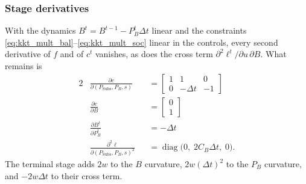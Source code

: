 \subsubsection{Stage derivatives}
With the dynamics $B^{t} = B^{t-1} - P_B^t \Delta t$ linear and the constraints
\eqref{eq:kkt_mult_bal}--\eqref{eq:kkt_mult_soc} linear in the controls, every
second derivative of $f$ and of $c^t$ vanishes, as does the cross term
$\partial^2 \ell^t / \partial u\, \partial B$.  What
remains is
\begin{alignat}{2}
&\frac{\partial c}{\partial(P_{\text{Subs}}, P_B, s)}
  &&= \begin{bmatrix} 1 & 1 & 0 \\ 0 & -\Delta t & -1 \end{bmatrix}
\label{eq:kkt_cu} \\
&\frac{\partial c}{\partial B}
  &&= \begin{bmatrix} 0 \\ 1 \end{bmatrix}
\label{eq:kkt_cx} \\
&\frac{\partial B^{t}}{\partial P_B^t} &&= -\Delta t
\label{eq:kkt_fu} \\
&\frac{\partial^2 \ell}{\partial (P_{\text{Subs}}, P_B, s)^2}
  &&= \operatorname{diag}\bigl(0,\; 2 C_B \Delta t,\; 0\bigr) .
\label{eq:kkt_luu}
\end{alignat}
The terminal stage adds $2w$ to the $B$ curvature, $2w(\Delta t)^2$ to the
$P_B$ curvature, and $-2w\Delta t$ to their cross term.

